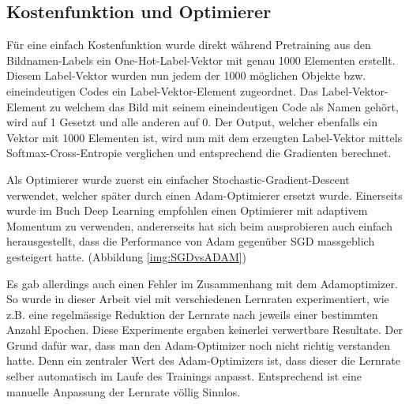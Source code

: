 \subsection{Kostenfunktion und Optimierer}
Für eine einfach Kostenfunktion wurde direkt während Pretraining aus den Bildnamen-Labels ein One-Hot-Label-Vektor mit genau 1000 Elementen erstellt.
Diesem Label-Vektor wurden nun jedem der 1000 möglichen Objekte bzw. eineindeutigen Codes ein Label-Vektor-Element zugeordnet. 
Das Label-Vektor-Element zu welchem das Bild mit seinem eineindeutigen Code als Namen gehört, wird auf 1 Gesetzt und alle anderen auf 0.
Der Output, welcher ebenfalls ein Vektor mit 1000 Elementen ist, wird nun mit dem erzeugten Label-Vektor mittels Softmax-Cross-Entropie verglichen und entsprechend die Gradienten berechnet. 

Als Optimierer wurde zuerst ein einfacher Stochastic-Gradient-Descent verwendet, welcher später durch einen Adam-Optimierer ersetzt wurde. 
Einerseits wurde im Buch Deep Learning \cite{deeplearning} empfohlen einen Optimierer mit adaptivem Momentum zu verwenden, andererseits hat sich beim ausprobieren auch einfach herausgestellt, dass die Performance von Adam gegenüber SGD massgeblich gesteigert hatte. (Abbildung \ref{img:SGDvsADAM})

Es gab allerdings auch einen Fehler im Zusammenhang mit dem Adamoptimizer.
So wurde in dieser Arbeit viel mit verschiedenen Lernraten experimentiert, wie z.B. eine regelmässige Reduktion der Lernrate nach jeweils einer bestimmten Anzahl Epochen.
Diese Experimente ergaben keinerlei verwertbare Resultate.
Der Grund dafür war, dass man den Adam-Optimizer noch nicht richtig verstanden hatte.
Denn ein zentraler Wert des Adam-Optimizers ist, dass dieser die Lernrate selber automatisch im Laufe des Trainings \grqq{}anpasst\grqq{}.
Entsprechend ist eine manuelle Anpassung der Lernrate völlig Sinnlos.


